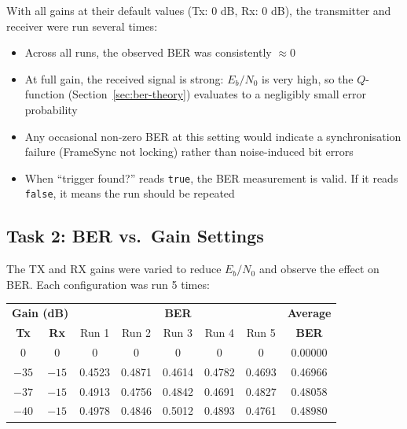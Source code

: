 With all gains at their default values (Tx: 0 dB, Rx: 0 dB), the transmitter and receiver were run several times:

\begin{itemize}
\item Across all runs, the observed BER was consistently $\approx 0$

\item At full gain, the received signal is strong: $E_b/N_0$ is very high, so the $Q$-function (Section~\ref{sec:ber-theory}) evaluates to a negligibly small error probability

\item Any occasional non-zero BER at this setting would indicate a synchronisation failure (FrameSync not locking) rather than noise-induced bit errors

\item When ``trigger found?'' reads \texttt{true}, the BER measurement is valid. If it reads \texttt{false}, it means the run should be repeated
\end{itemize}

\subsection{Task 2: BER vs.\ Gain Settings}

The TX and RX gains were varied to reduce $E_b/N_0$ and observe the effect on BER. Each configuration was run 5 times:

\begin{center}
\renewcommand{\arraystretch}{1.5}
\begin{tabular}{cc|ccccc|c}
\hline
\multicolumn{2}{c|}{\textbf{Gain (dB)}} & \multicolumn{5}{c|}{\textbf{BER}} & \textbf{Average} \\
\textbf{Tx} & \textbf{Rx} & Run 1 & Run 2 & Run 3 & Run 4 & Run 5 & \textbf{BER} \\
\hline
0 & 0 & 0 & 0 & 0 & 0 & 0 & 0.00000 \\
$-35$ & $-15$ & 0.4523 & 0.4871 & 0.4614 & 0.4782 & 0.4693 & 0.46966 \\
$-37$ & $-15$ & 0.4913 & 0.4756 & 0.4842 & 0.4691 & 0.4827 & 0.48058 \\
$-40$ & $-15$ & 0.4978 & 0.4846 & 0.5012 & 0.4893 & 0.4761 & 0.48980 \\
\hline
\end{tabular}
\end{center}


